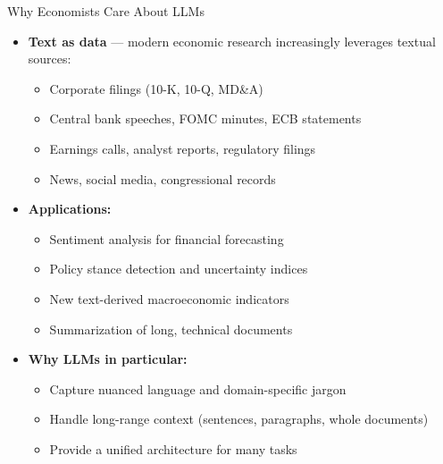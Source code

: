\documentclass[10pt,english,aspectratio=169]{beamer}
\begin{document}
\begin{frame}{Why Economists Care About LLMs}
\begin{itemize}
\item \textbf{Text as data} --- modern economic research increasingly leverages textual sources:
\begin{itemize}
    \item Corporate filings (10-K, 10-Q, MD\&A)
    \item Central bank speeches, FOMC minutes, ECB statements
    \item Earnings calls, analyst reports, regulatory filings
    \item News, social media, congressional records
\end{itemize}

\medskip
\item \textbf{Applications:}
\begin{itemize}
    \item Sentiment analysis for financial forecasting
    \item Policy stance detection and uncertainty indices
    \item New text-derived macroeconomic indicators
    \item Summarization of long, technical documents
\end{itemize}

\medskip
\item \textbf{Why LLMs in particular:}
\begin{itemize}
    \item Capture nuanced language and domain-specific jargon
    \item Handle long-range context (sentences, paragraphs, whole documents)
    \item Provide a unified architecture for many tasks
\end{itemize}
\end{itemize}
\end{frame}
\end{document}
